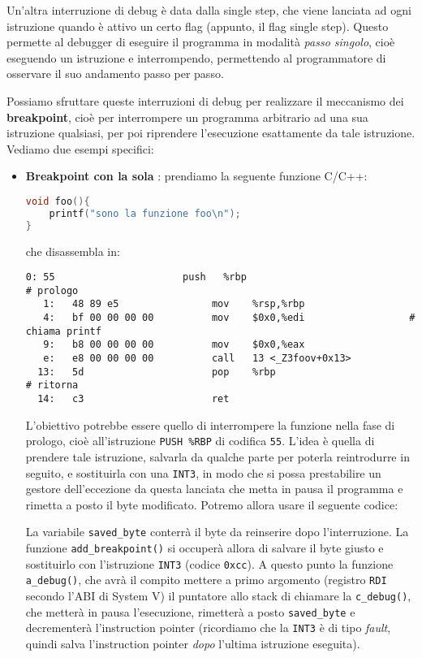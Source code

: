 \documentclass[a4paper,11pt]{article}
\begin{document}
Un'altra interruzione di debug è data dalla single step, che viene lanciata ad ogni istruzione quando è attivo un certo flag (appunto, il flag single step). Questo permette al debugger di eseguire il programma in modalità \textit{passo singolo}, cioè eseguendo un istruzione e interrompendo, permettendo al programmatore di osservare il suo andamento passo per passo.

\par\smallskip

Possiamo sfruttare queste interruzioni di debug per realizzare il meccanismo dei \textbf{breakpoint}, cioè per interrompere un programma arbitrario ad una sua istruzione qualsiasi, per poi riprendere l'esecuzione esattamente da tale istruzione.
Vediamo due esempi specifici:
\begin{itemize}
	\item \textbf{Breakpoint con la sola }: prendiamo la seguente funzione C/C++:
\begin{lstlisting}[language=C++, style=codestyle]	
void foo(){
    printf("sono la funzione foo\n");
}
\end{lstlisting}
che disassembla in:
\begin{lstlisting}[language=assembler, style=codestyle]	
	 0:	55                   	push   %rbp								# prologo
   1:	48 89 e5             	mov    %rsp,%rbp
   4:	bf 00 00 00 00       	mov    $0x0,%edi				  # chiama printf
   9:	b8 00 00 00 00       	mov    $0x0,%eax
   e:	e8 00 00 00 00       	call   13 <_Z3foov+0x13>
  13:	5d                   	pop    %rbp								# ritorna
  14:	c3                   	ret
\end{lstlisting}
L'obiettivo potrebbe essere quello di interrompere la funzione nella fase di prologo, cioè all'istruzione \lstinline|PUSH %RBP| di codifica \lstinline|55|.
L'idea è quella di prendere tale istruzione, salvarla da qualche parte per poterla reintrodurre in seguito, e sostituirla con una \lstinline|INT3|, in modo che si possa prestabilire un gestore dell'eccezione da questa lanciata che metta in pausa il programma e rimetta a posto il byte modificato.
Potremo allora usare il seguente codice:
\lstset{style=codestyle, language=c++}

La variabile \lstinline|saved_byte| conterrà il byte da reinserire dopo l'interruzione.
\lstset{style=codestyle, language=assembler}
La funzione \lstinline|add_breakpoint()| si occuperà allora di salvare il byte giusto e sostituirlo con l'istruzione \lstinline|INT3| (codice \lstinline|0xcc|).
A questo punto la funzione \lstinline|a_debug()|, che avrà il compito mettere a primo argomento (registro \lstinline|RDI| secondo l'ABI di System V) il puntatore allo stack di chiamare la \lstinline|c_debug()|, che metterà in pausa l'esecuzione, rimetterà a posto \lstinline|saved_byte| e decrementerà l'instruction pointer (ricordiamo che la \lstinline|INT3| è di tipo \textit{fault}, quindi salva l'instruction pointer \textit{dopo} l'ultima istruzione eseguita).


\end{itemize}
\end{document}
